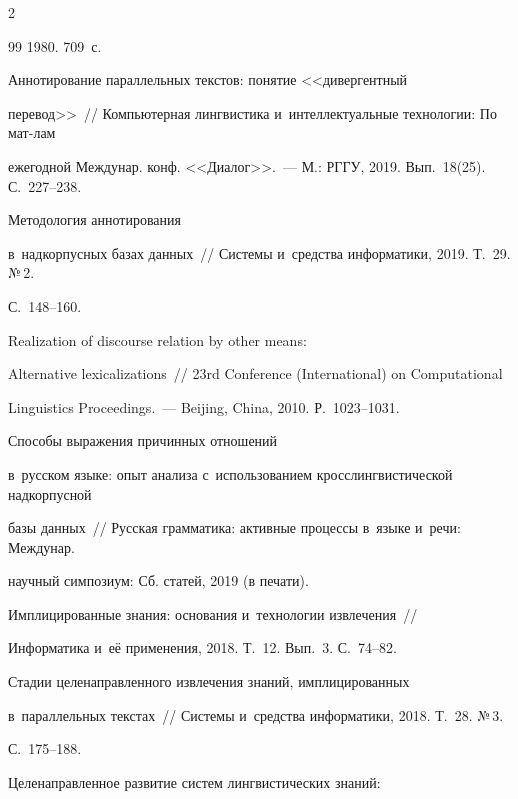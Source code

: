 \begin{multicols}{2}
{{\begin{thebibliography}{99}
1980. 709~с.




 Аннотирование параллельных текстов: понятие <<дивергентный 


перевод>>~// Компьютерная лингвистика и~интеллектуальные технологии: По мат-лам 


ежегодной Междунар. конф. <<Диалог>>.~--- М.: РГГУ, 2019. Вып.~18(25). С.~227--238.




 Методология аннотирования 


в~надкорпусных базах данных~// Системы и~средства информатики, 2019. Т.~29. №\,2. 


С.~148--160.




 Realization of discourse relation by other means: 


Alternative lexicalizations~// 23rd Conference (International) on Computational 


Linguistics Proceedings.~--- Beijing, China, 2010. Р.~1023--1031.




 Способы выражения причинных отношений 


в~русском языке: опыт анализа с~использованием кросслингвистической надкорпусной 


базы данных~// Русская грамматика: активные процессы в~языке и~речи: Междунар. 


научный симпозиум: Сб. статей, 2019 (в печати).




 Имплицированные знания: основания и~технологии извлечения~// 


Информатика и~её применения, 2018. Т.~12. Вып.~3. С.~74--82. 




 Стадии целенаправленного извлечения знаний, имплицированных 


в~параллельных текстах~// Системы и~средства информатики, 2018. Т.~28. №\,3.  


С.~175--188.







 Целенаправленное развитие систем лингвистических знаний: 



\end{thebibliography}}}
\end{multicols}
